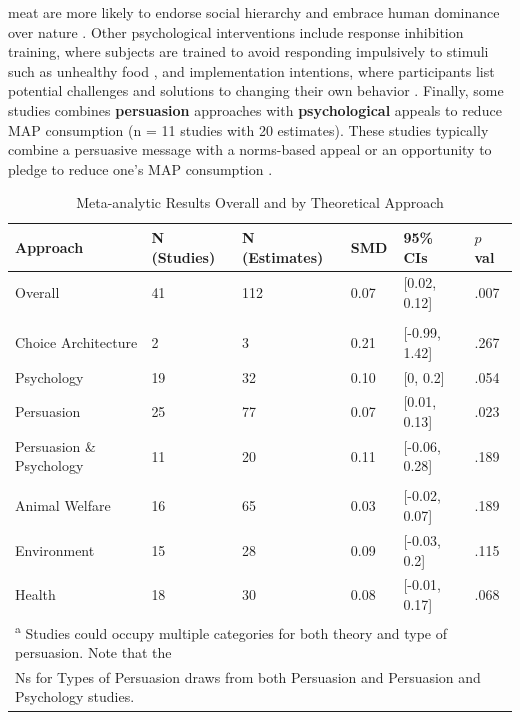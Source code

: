 \documentclass[sn-nature,referee,pdflatex]{sn-jnl}
\begin{document}
meat are more likely to endorse social hierarchy and embrace human
dominance over nature \citep{allen2002}. Other psychological
interventions include response inhibition training, where subjects are
trained to avoid responding impulsively to stimuli such as unhealthy
food \citep{camp2019}, and implementation intentions, where participants
list potential challenges and solutions to changing their own behavior
\citep{aberman2018, shreedhar2021}. Finally, some studies combines
\textbf{persuasion} approaches with \textbf{psychological} appeals to
reduce MAP consumption
\citep{aberman2018, berndsen2005, bertolaso2015, carfora2023, fehrenbach2015, hennessy2016, mathur2021effectiveness, mattson2020, piester2020, shreedhar2021}
(n = 11 studies with 20 estimates). These studies typically combine a
persuasive message with a norms-based appeal
\citep{piester2020, mattson2020} or an opportunity to pledge to reduce
one's MAP consumption \citep{mathur2021effectiveness, shreedhar2021}.

\begin{table}[!ht]
\centering
\caption{\label{tab:table_one}Meta-analytic Results Overall and by Theoretical Approach}
\centering
\begin{tabular}[t]{llllll}
\toprule
Approach & N (Studies) & N (Estimates) & SMD & 95\% CIs & $p$ val\\
\midrule
Overall & 41 & 112 & 0.07 & {}[0.02, 0.12] & .007\\
\addlinespace[0.5em]
\multicolumn{6}{l}{\textbf{Theory}}\\
\hspace{1em}Choice Architecture & 2 & 3 & 0.21 & {}[-0.99, 1.42] & .267\\
\hspace{1em}Psychology & 19 & 32 & 0.10 & {}[0, 0.2] & .054\\
\hspace{1em}Persuasion & 25 & 77 & 0.07 & {}[0.01, 0.13] & .023\\
\hspace{1em}Persuasion \& Psychology & 11 & 20 & 0.11 & {}[-0.06, 0.28] & .189\\
\addlinespace[0.5em]
\multicolumn{6}{l}{\textbf{Type of Persuasion}}\\
\hspace{1em}Animal Welfare & 16 & 65 & 0.03 & {}[-0.02, 0.07] & .189\\
\hspace{1em}Environment & 15 & 28 & 0.09 & {}[-0.03, 0.2] & .115\\
\hspace{1em}Health & 18 & 30 & 0.08 & {}[-0.01, 0.17] & .068\\
\bottomrule
\multicolumn{6}{l}{\textsuperscript{a} Studies could occupy multiple categories for both theory and type of persuasion. Note that the}\\
\multicolumn{6}{l}{Ns for Types of Persuasion draws from both Persuasion and Persuasion and Psychology studies.}\\
\end{tabular}
\end{table}
\end{document}
